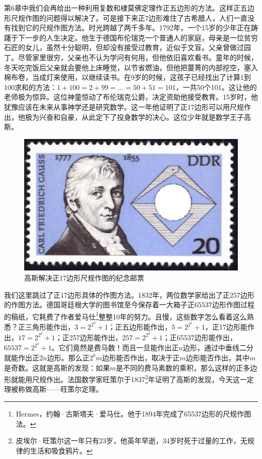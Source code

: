 \documentclass[b5paper]{ctexart}
\begin{document}
 \label{sec:Gauss-17-gon}
第6章中我们会再给出一种利用复数和棣莫佛定理作正五边形的方法。这样正五边形尺规作图的问题得以解决了。可是接下来正7边形难住了古希腊人，人们一直没有找到它的尺规作图方法。时光跨越了两千多年。1792年，一个15岁的少年正在踌躇于下一步的人生决定。他生于德国布伦瑞克一个普通人的家庭，母亲是一位贫穷石匠的女儿，虽然十分聪明，但却没有接受过教育，近似于文盲。父亲曾做过园丁。尽管家里很穷，父亲也不认为学问有何用，但他依旧喜欢看书。童年的时候，冬天吃完饭后父亲就会要他上床睡觉，以节省燃油，但他把蔓菁的内部挖空，塞入棉布卷，当成灯来使用，以继续读书。在9岁的时候，这孩子已经找出了计算1到100求和的方法：$1 + 100 = 2 + 99 = \dotso = 50 + 51 = 101$，一共50个101。这让他的老师极为惊异。这位神童惊动了布伦瑞克公爵，决定资助他接受教育。15岁时，他犹豫应该在未来从事神学还是研究数学。这一年他证明了正17边形可以用尺规作出\cite{Gauss-Britannia-2025}，他极为兴奋和自豪，从此定下了投身数学的决心。这位少年就是数学王子高斯。

\begin{figure}[htbp]
 \centering
 \includegraphics[scale=0.5]{img/gauss-17gon}
 \caption{高斯解决正17边形尺规作图的纪念邮票}
 \label{fig:gauss-17gon}
\end{figure}

\label{sec:geometric-cons-polygon}
我们这里跳过了正17边形具体的作图方法。1832年，两位数学家给出了正257边形的作图方法。德国哥廷根大学的图书馆至今保存着一大箱子正65537边形作图过程的稿纸，它耗费了作者爱马仕\footnote{Hermes，约翰·古斯塔夫·爱马仕。他于1894年完成了65537边形的尺规作图法。}整整10年的努力。且慢，这些数字怎么看着这么熟悉？正三角形能作出，$3 = 2^{2^0} + 1$；正五边形能作出，$5 = 2^{2^1} + 1$，正17边形能作出，$17 = 2^{2^2} + 1$；正257边形能作出，$257 = 2^{2^3} + 1$；正65537边形能作出，$65537 = 2^{2^4} + 1$。它们竟然是费马数！而且一旦能作出正$n$边形，通过中垂线二分就能作出正$2n$边形。那么正$2^k m$边形能否作出，取决于正$m$边形能否作出，其中$m$是奇数。这就是高斯的发现：如果$m$是不同的费马素数的乘积，那么这样的正多边形就能用尺规作出。法国数学家旺策尔于1837\footnote{皮埃尔·旺策尔这一年只有23岁，他英年早逝，34岁时死于过量的工作，无规律的生活和吸食鸦片。}年证明了高斯的发现，今天这一定理被称做高斯——旺策尔定理。
\end{document}
